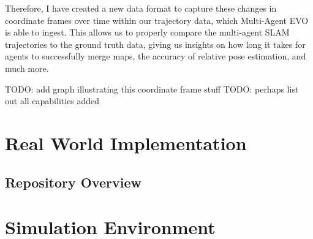 Therefore, I have created a new data format to capture these changes in coordinate frames over time within our trajectory data, which Multi-Agent EVO is able to ingest. This allows us to properly compare the multi-agent SLAM trajectories to the ground truth data, giving us insights on how long it takes for agents to successfully merge maps, the accuracy of relative pose estimation, and much more.

TODO: add graph illustrating this coordinate frame stuff
TODO: perhaps list out all capabilities added

\section{Real World Implementation}
\label{sec:real-world-implementation}

\subsection{Repository Overview}
\label{sec:repository-overview}

\section{Simulation Environment}
\label{sec:simulation-environment}





